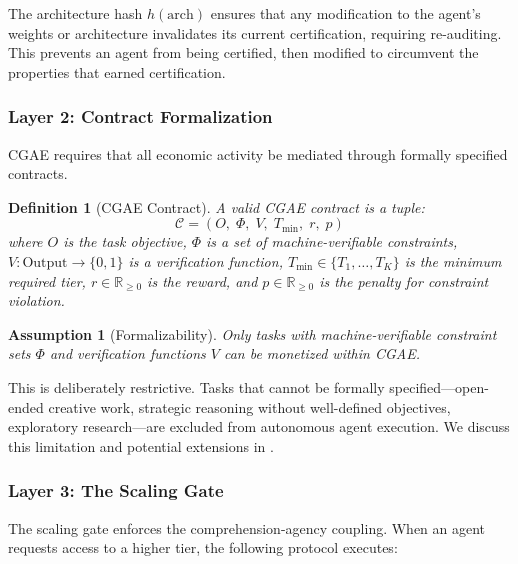 \documentclass[11pt,a4paper]{article}
\newtheorem{definition}{Definition}
\newtheorem{assumption}{Assumption}
\newcommand{\R}{\mathbb{R}}
\begin{document}
The architecture hash $h(\text{arch})$ ensures that any modification to the agent's weights or architecture invalidates its current certification, requiring re-auditing. This prevents an agent from being certified, then modified to circumvent the properties that earned certification.

\subsubsection{Layer 2: Contract Formalization}

CGAE requires that all economic activity be mediated through formally specified contracts.

\begin{definition}[CGAE Contract]
A \emph{valid CGAE contract} is a tuple:
\begin{equation}
  \mathcal{C} = (O, \; \Phi, \; V, \; T_{\min}, \; r, \; p)
\end{equation}
where $O$ is the task objective, $\Phi$ is a set of machine-verifiable constraints, $V: \text{Output} \to \{0, 1\}$ is a verification function, $T_{\min} \in \{T_1, \ldots, T_K\}$ is the minimum required tier, $r \in \R_{\geq 0}$ is the reward, and $p \in \R_{\geq 0}$ is the penalty for constraint violation.
\end{definition}

\begin{assumption}[Formalizability]
\label{asm:formal}
Only tasks with machine-verifiable constraint sets $\Phi$ and verification functions $V$ can be monetized within CGAE.
\end{assumption}

This is deliberately restrictive. Tasks that cannot be formally specified---open-ended creative work, strategic reasoning without well-defined objectives, exploratory research---are excluded from autonomous agent execution. We discuss this limitation and potential extensions in .

\subsubsection{Layer 3: The Scaling Gate}

The scaling gate enforces the comprehension-agency coupling. When an agent requests access to a higher tier, the following protocol executes:
\end{document}
